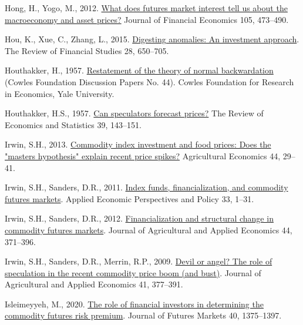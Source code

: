 \documentclass[]{elsarticle} %
\newlength{\cslhangindent}
\newlength{\cslentryspacingunit} %
\newenvironment{CSLReferences}[2] %
 {%
  \setlength{\parindent}{0pt}
  \ifodd #1
  \let\oldpar\par
  \def\par{\hangindent=\cslhangindent\oldpar}
  \fi
  \setlength{\parskip}{#2\cslentryspacingunit}
 }%
 {}
\begin{document}
\begin{CSLReferences}{1}{0}
\leavevmode{}%
Hong, H., Yogo, M., 2012. \href{https://doi.org/10.1016/j.jfineco.2012.04.005}{What does futures market interest tell us about the macroeconomy and asset prices?} Journal of Financial Economics 105, 473--490.

\leavevmode{}%
Hou, K., Xue, C., Zhang, L., 2015. \href{https://doi.org/10.1093/rfs/hhu068}{Digesting anomalies: An investment approach}. The Review of Financial Studies 28, 650--705.

\leavevmode{}%
Houthakker, H., 1957. \href{https://EconPapers.repec.org/RePEc:cwl:cwldpp:44}{Restatement of the theory of normal backwardation} (Cowles Foundation Discussion Papers No. 44). Cowles Foundation for Research in Economics, Yale University.

\leavevmode{}%
Houthakker, H.S., 1957. \href{https://doi.org/10.2307/1928531}{Can speculators forecast prices?} The Review of Economics and Statistics 39, 143--151.

\leavevmode{}%
Irwin, S.H., 2013. \href{https://doi.org/10.1111/agec.12048}{Commodity index investment and food prices: Does the "masters hypothesis" explain recent price spikes?} Agricultural Economics 44, 29--41.

\leavevmode{}%
Irwin, S.H., Sanders, D.R., 2011. \href{https://doi.org/10.1093/aepp/ppq032}{Index funds, financialization, and commodity futures markets}. Applied Economic Perspectives and Policy 33, 1--31.

\leavevmode{}%
Irwin, S.H., Sanders, D.R., 2012. \href{https://doi.org/10.1017/S1074070800000481}{Financialization and structural change in commodity futures markets}. Journal of Agricultural and Applied Economics 44, 371--396.

\leavevmode{}%
Irwin, S.H., Sanders, D.R., Merrin, R.P., 2009. \href{https://doi.org/10.1017/S1074070800002856}{Devil or angel? The role of speculation in the recent commodity price boom (and bust)}. Journal of Agricultural and Applied Economics 41, 377--391.

\leavevmode{}%
Isleimeyyeh, M., 2020. \href{https://doi.org/10.1002/fut.22122}{The role of financial investors in determining the commodity futures risk premium}. Journal of Futures Markets 40, 1375--1397.


\end{CSLReferences}
\end{document}
